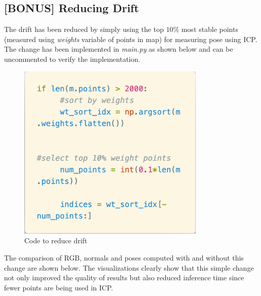 \documentclass[12pt, a4paper]{article}
\begin{document}
\subsection{[BONUS] Reducing Drift}
The drift has been reduced by simply using the top $10\%$ most stable points (measured using \textit{weights} variable of points in map) for measuring pose using ICP. The change has been implemented in \textit{main.py} as shown below and can be uncommented to verify the implementation.
\begin{figure}[H]
  \centering
  \includegraphics[width=0.8\textwidth]{./results/dense_slam/bonus_code.png}
  \caption{Code to reduce drift}
\end{figure}
\noindent The comparison of RGB, normals and poses computed with and without this change are shown below. The visualizations clearly show that this simple change not only improved the quality of results but also reduced inference time since fewer points are being used in ICP.
\end{document}
